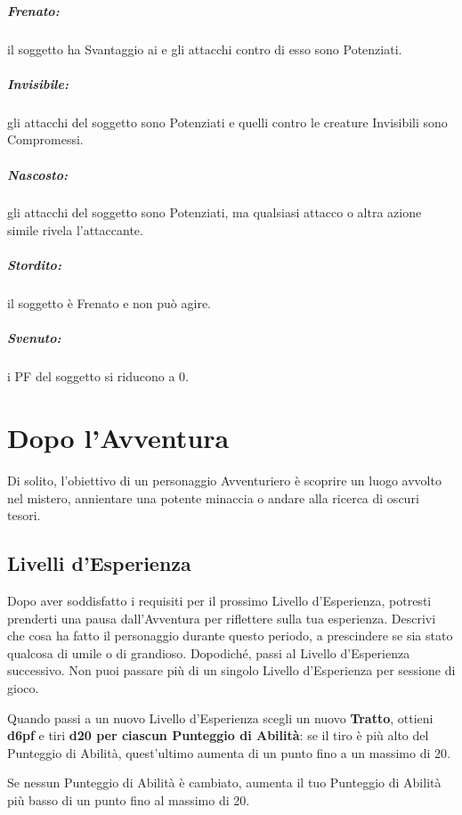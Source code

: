 \documentclass[itdr]{subfiles}
\begin{document}
\vfill
{}
\subparagraph{Frenato:} il soggetto ha Svantaggio ai  e gli attacchi contro di esso sono Potenziati.

\vfill
{}
\subparagraph{Invisibile:} gli attacchi del soggetto sono Potenziati e quelli contro le creature Invisibili sono Compromessi.

\vfill
{}
\subparagraph{Nascosto:} gli attacchi del soggetto sono Potenziati, ma qualsiasi attacco o altra azione simile rivela l’attaccante.

\vfill
{}
\subparagraph{Stordito:} il soggetto è Frenato e non può agire.

\vfill
{}
\subparagraph{Svenuto:} i PF del soggetto si riducono a 0.

\break

\section{Dopo l'Avventura}

Di solito, l’obiettivo di un personaggio Avventuriero è scoprire un luogo avvolto nel mistero, annientare una potente minaccia o andare alla ricerca di oscuri tesori.

\vfill
\subsection{Livelli d’Esperienza}
Dopo aver soddisfatto i requisiti per il prossimo Livello d’Esperienza, potresti prenderti una pausa dall’Avventura per riflettere sulla tua esperienza. Descrivi che cosa ha fatto il personaggio durante questo periodo, a prescindere se sia stato qualcosa di umile o di grandioso. Dopodiché, passi al Livello d’Esperienza successivo. Non puoi passare più di un singolo Livello d’Esperienza per sessione di gioco.

Quando passi a un nuovo Livello d’Esperienza scegli un nuovo \textbf{Tratto}, ottieni \textbf{d6pf} e tiri \textbf{d20 per ciascun Punteggio di Abilità}: se il tiro è più alto del Punteggio di Abilità, quest’ultimo aumenta di un punto fino a un massimo di 20. 

Se nessun Punteggio di Abilità è cambiato, aumenta il tuo Punteggio di Abilità più basso di un punto fino al massimo di 20.
\end{document}
